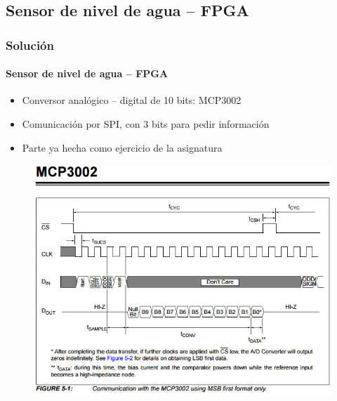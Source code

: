 \documentclass[compress]{beamer}
\begin{document}
	\subsection{Sensor de nivel de agua -- FPGA}
		\begin{frame}
			\frametitle{Soluci\'on}
			\framesubtitle{Sensor de nivel de agua -- FPGA}
				\begin{itemize}
					\item
					{

						Conversor anal\'ogico -- digital de 10 bits: MCP3002

					}
					\item
					{

						Comunicaci\'on por SPI, con 3 bits para pedir informaci\'on

					}
					\item
					{

						Parte ya hecha como ejercicio de la asignatura

					}
				\end{itemize}
				\begin{figure}
					\includegraphics[keepaspectratio = true, totalheight=0.6\textheight]{figuras/adc_spi.png}
				\end{figure}
 		\end{frame}
\end{document}
